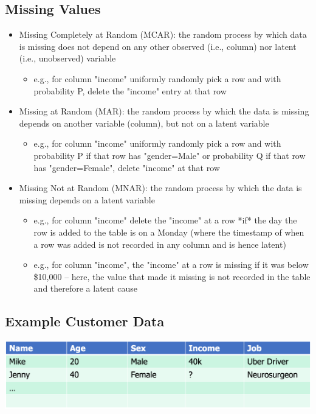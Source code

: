 \documentclass[11pt]{article}
\theoremstyle{definition}
\begin{document}
\subsection{Missing Values}
\begin{itemize}
    \item Missing Completely at Random (MCAR): the random process by which data is
    missing does not depend on any other observed (i.e., column) nor latent
    (i.e., unobserved) variable
    \begin{itemize}
        \item e.g., for column "income" uniformly randomly pick a row and with probability P, delete the
        "income" entry at that row
    \end{itemize}
    \item Missing at Random (MAR): the random process by which the data is missing
    depends on another variable (column), but not on a latent variable
    \begin{itemize}
        \item e.g., for column "income" uniformly randomly pick a row and with probability P if that row has
        "gender=Male" or probability Q if that row has "gender=Female", delete "income" at that row
    \end{itemize}
    \item Missing Not at Random (MNAR): the random process by which the data is missing depends on a latent variable
    \begin{itemize}
        \item e.g., for column "income" delete the "income" at a row *if* the day the row is added to the
        table is on a Monday (where the timestamp of when a row was added is not recorded in any
        column and is hence latent)
        \item e.g., for column "income", the "income" at a row is missing if it was below \$10,000 – here, the
        value that made it missing is not recorded in the table and therefore a latent cause
    \end{itemize}
\end{itemize}
\subsection{Example Customer Data}
\includegraphics[width=\textwidth]{15.png}
\end{document}
